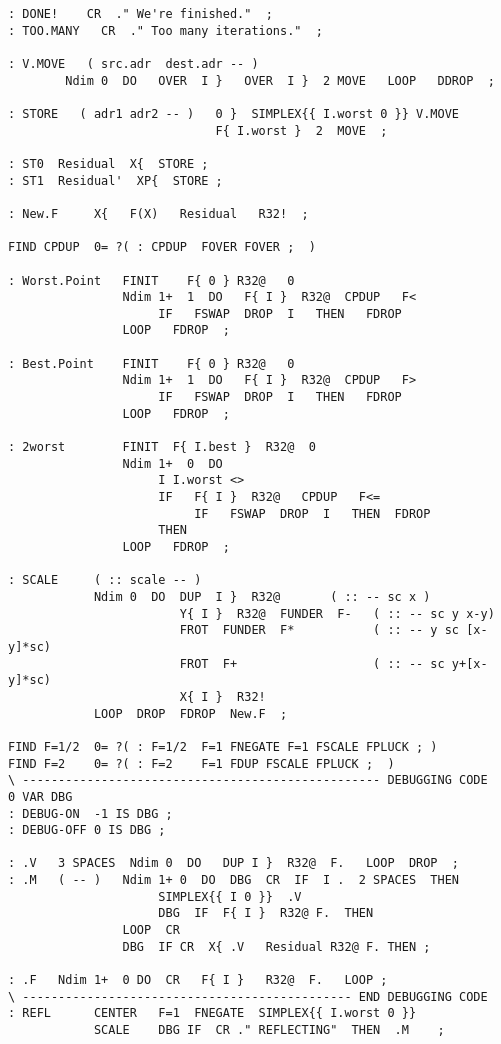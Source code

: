 \begin{lstlisting}
: DONE!    CR  ." We're finished."  ;
: TOO.MANY   CR  ." Too many iterations."  ;

: V.MOVE   ( src.adr  dest.adr -- )
        Ndim 0  DO   OVER  I }   OVER  I }  2 MOVE   LOOP   DDROP  ;

: STORE   ( adr1 adr2 -- )   0 }  SIMPLEX{{ I.worst 0 }} V.MOVE
                             F{ I.worst }  2  MOVE  ;

: ST0  Residual  X{  STORE ;
: ST1  Residual'  XP{  STORE ;

: New.F     X{   F(X)   Residual   R32!  ;

FIND CPDUP  0= ?( : CPDUP  FOVER FOVER ;  )

: Worst.Point   FINIT    F{ 0 } R32@   0
                Ndim 1+  1  DO   F{ I }  R32@  CPDUP   F<
                     IF   FSWAP  DROP  I   THEN   FDROP
                LOOP   FDROP  ;

: Best.Point    FINIT    F{ 0 } R32@   0
                Ndim 1+  1  DO   F{ I }  R32@  CPDUP   F>
                     IF   FSWAP  DROP  I   THEN   FDROP
                LOOP   FDROP  ;

: 2worst        FINIT  F{ I.best }  R32@  0
                Ndim 1+  0  DO
                     I I.worst <>
                     IF   F{ I }  R32@   CPDUP   F<=
                          IF   FSWAP  DROP  I   THEN  FDROP
                     THEN
                LOOP   FDROP  ;

: SCALE     ( :: scale -- )
            Ndim 0  DO  DUP  I }  R32@       ( :: -- sc x )
                        Y{ I }  R32@  FUNDER  F-   ( :: -- sc y x-y)
                        FROT  FUNDER  F*           ( :: -- y sc [x-y]*sc)
                        FROT  F+                   ( :: -- sc y+[x-y]*sc)
                        X{ I }  R32!
            LOOP  DROP  FDROP  New.F  ;

FIND F=1/2  0= ?( : F=1/2  F=1 FNEGATE F=1 FSCALE FPLUCK ; )
FIND F=2    0= ?( : F=2    F=1 FDUP FSCALE FPLUCK ;  )
\ -------------------------------------------------- DEBUGGING CODE
0 VAR DBG
: DEBUG-ON  -1 IS DBG ;
: DEBUG-OFF 0 IS DBG ;

: .V   3 SPACES  Ndim 0  DO   DUP I }  R32@  F.   LOOP  DROP  ;
: .M   ( -- )   Ndim 1+ 0  DO  DBG  CR  IF  I .  2 SPACES  THEN
                     SIMPLEX{{ I 0 }}  .V
                     DBG  IF  F{ I }  R32@ F.  THEN
                LOOP  CR
                DBG  IF CR  X{ .V   Residual R32@ F. THEN ;

: .F   Ndim 1+  0 DO  CR   F{ I }   R32@  F.   LOOP ;
\ ---------------------------------------------- END DEBUGGING CODE
: REFL      CENTER   F=1  FNEGATE  SIMPLEX{{ I.worst 0 }}
            SCALE    DBG IF  CR ." REFLECTING"  THEN  .M    ;



\end{lstlisting}
